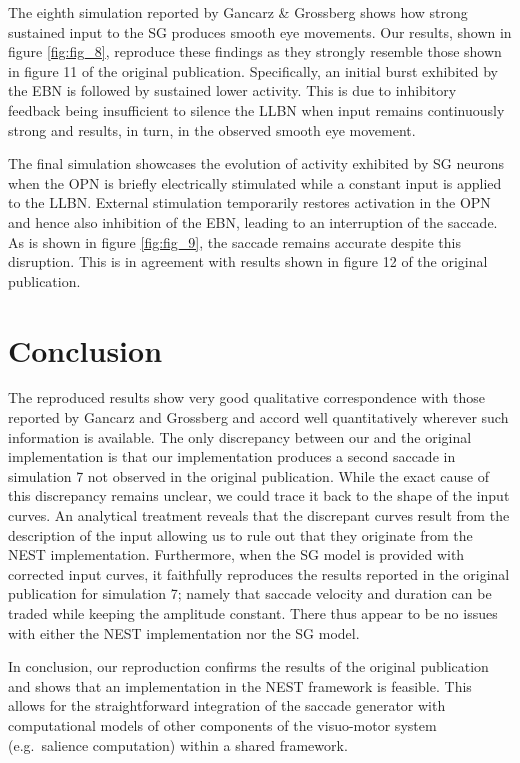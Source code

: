 \documentclass[10pt,a4paper,onecolumn]{article}
\begin{document}
The eighth simulation reported by Gancarz \& Grossberg
\autocite{Gancarz1998} shows how strong sustained input to the SG
produces smooth eye movements. Our results, shown in figure
\ref{fig:fig_8}, reproduce these findings as they strongly resemble
those shown in figure 11 of the original publication. Specifically, an
initial burst exhibited by the EBN is followed by sustained lower
activity. This is due to inhibitory feedback being insufficient to
silence the LLBN when input remains continuously strong and results, in
turn, in the observed smooth eye movement.

The final simulation showcases the evolution of activity exhibited by SG
neurons when the OPN is briefly electrically stimulated while a constant
input is applied to the LLBN. External stimulation temporarily restores
activation in the OPN and hence also inhibition of the EBN, leading to
an interruption of the saccade. As is shown in figure \ref{fig:fig_9},
the saccade remains accurate despite this disruption. This is in
agreement with results shown in figure 12 of the original publication.

\section{Conclusion}\label{conclusion}

The reproduced results show very good qualitative correspondence with
those reported by Gancarz and Grossberg \autocite{Gancarz1998} and
accord well quantitatively wherever such information is available. The
only discrepancy between our and the original implementation is that our
implementation produces a second saccade in simulation 7 not observed in
the original publication. While the exact cause of this discrepancy
remains unclear, we could trace it back to the shape of the input
curves. An analytical treatment reveals that the discrepant curves
result from the description of the input allowing us to rule out that
they originate from the NEST implementation. Furthermore, when the SG
model is provided with corrected input curves, it faithfully reproduces
the results reported in the original publication for simulation 7;
namely that saccade velocity and duration can be traded while keeping
the amplitude constant. There thus appear to be no issues with either
the NEST implementation nor the SG model.

In conclusion, our reproduction confirms the results of the original
publication and shows that an implementation in the NEST framework is
feasible. This allows for the straightforward integration of the saccade
generator with computational models of other components of the
visuo-motor system (e.g.~salience computation) within a shared
framework.
\end{document}
